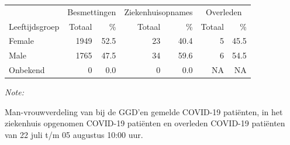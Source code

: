 \documentclass[
  english,
  man,floatsintext]{apa6}
\begin{document}
\begin{table}[H]
\centering\begingroup\fontsize{11}{13}\selectfont

\begin{threeparttable}
\begin{tabular}{lrrrrrr}
\toprule
\multicolumn{1}{c}{ } & \multicolumn{2}{c}{Besmettingen} & \multicolumn{2}{c}{Ziekenhuisopnames} & \multicolumn{2}{c}{Overleden} \\
\cmidrule(l{3pt}r{3pt}){2-3} \cmidrule(l{3pt}r{3pt}){4-5} \cmidrule(l{3pt}r{3pt}){6-7}
Leeftijdsgroep & Totaal & \% & Totaal & \% & Totaal & \%\\
\midrule
Female & 1949 & 52.5 & 23 & 40.4 & 5 & 45.5\\
Male & 1765 & 47.5 & 34 & 59.6 & 6 & 54.5\\
Onbekend & 0 & 0.0 & 0 & 0.0 & NA & NA\\
\bottomrule
\end{tabular}
\begin{tablenotes}
\item \textit{Note: } 
\item Man-vrouwverdeling van bij de GGD’en gemelde COVID-19 patiënten, in het ziekenhuis opgenomen COVID-19 patiënten en overleden COVID-19 patiënten van 22 juli t/m 05 augustus 10:00 uur.
\end{tablenotes}
\end{threeparttable}
\endgroup{}
\end{table}
\newpage
\end{document}
